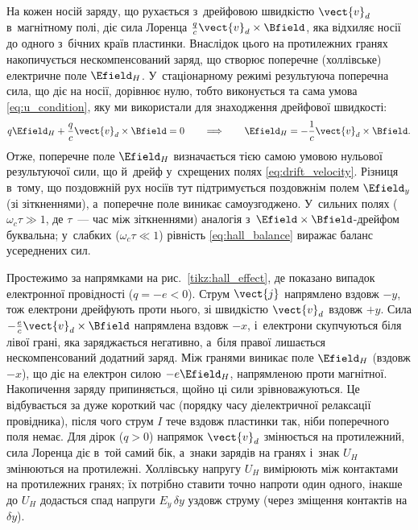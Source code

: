 На кожен носій заряду, що рухається з~дрейфовою швидкістю $\vect{v}_d$ в~магнітному полі, діє сила Лоренца $\frac{q}{c}\vect{v}_d \times \Bfield$, яка відхиляє носії до одного з~бічних країв пластинки. Внаслідок цього на протилежних гранях накопичується нескомпенсований заряд, що створює поперечне (холлівське) електричне поле $\Efield_H$. У~стаціонарному режимі результуюча поперечна сила, що діє на носії, дорівнює нулю, тобто виконується та сама умова \eqref{eq:u_condition}, яку ми використали для знаходження дрейфової швидкості:
\begin{equation}\label{eq:hall_balance}
	q\Efield_H + \frac{q}{c}\vect{v}_d \times \Bfield = 0
	\qquad \Longrightarrow \qquad
	\Efield_H = -\frac{1}{c}\vect{v}_d \times \Bfield.
\end{equation}
Отже, поперечне поле $\Efield_H$ визначається тією самою умовою нульової результуючої сили, що й~дрейф у~схрещених полях \eqref{eq:drift_velocity}. Різниця в~тому, що поздовжній рух носіїв тут підтримується поздовжнім полем $\Efield_y$ (зі зіткненнями), а~поперечне поле виникає самоузгоджено. У~сильних полях ($\omega_c\tau \gg 1$, де $\tau$~--- час між зіткненнями) аналогія з~$\Efield\times\Bfield$-дрейфом буквальна; у~слабких ($\omega_c\tau \ll 1$) рівність \eqref{eq:hall_balance} виражає баланс усереднених сил.

Простежимо за напрямками на рис.~\ref{tikz:hall_effect}, де показано випадок електронної провідності ($q=-e<0$). Струм $\vect{j}$ напрямлено вздовж $-y$, тож електрони дрейфують проти нього, зі швидкістю $\vect{v}_d$ вздовж $+y$. Сила $-\frac{e}{c}\vect{v}_d\times\Bfield$ напрямлена вздовж $-x$, і~електрони скупчуються біля лівої грані, яка заряджається негативно, а~біля правої лишається нескомпенсований додатний заряд. Між гранями виникає поле $\Efield_H$ (вздовж $-x$), що діє на електрон силою $-e\Efield_H$, напрямленою проти магнітної. Накопичення заряду припиняється, щойно ці сили зрівноважуються. Це відбувається за дуже короткий час (порядку часу діелектричної релаксації провідника), після чого струм $I$ тече вздовж пластинки так, ніби поперечного поля немає. Для дірок ($q>0$) напрямок $\vect{v}_d$ змінюється на протилежний, сила Лоренца діє в~той самий бік, а~знаки зарядів на гранях і~знак $U_H$ змінюються на протилежні. Холлівську напругу $U_H$ вимірюють між контактами на протилежних гранях; їх потрібно ставити точно напроти один одного, інакше до $U_H$ додасться спад напруги $E_y\,\delta y$ уздовж струму (через зміщення контактів на $\delta y$).

